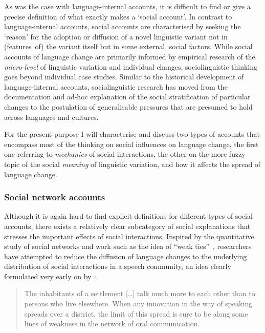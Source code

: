 As was the case with language-internal accounts, it is difficult to find or give a precise definition of what exactly makes a `social account'. In contrast to language-internal accounts, social accounts are characterised by seeking the `reason' for the adoption or diffusion of a novel linguistic variant not in (features~of) the variant itself but in some external, social factors.
While social accounts of language change are primarily informed by empirical research of the \emph{micro-level} of linguistic variation and individual changes, sociolinguistic thinking goes beyond individual case studies.
Similar to the historical development of language-internal accounts, sociolinguistic research %
has moved from the documentation and ad-hoc explanation of the social stratification of particular changes to the postulation of generalisable pressures that are presumed to hold across languages and cultures.

For the present purpose I will characterise and discuss two types of accounts that encompass most of the thinking on social influences on language change, the first one referring to \emph{mechanics} of social interactions, the other on the more fuzzy topic of the social \emph{meaning} of linguistic variation, and how it affects the spread of language change.

\subsubsection{Social network accounts}
\label{sec:interactorselection}

Although it is again hard to find explicit definitions for different types of social accounts, there exists a relatively clear subcategory of social explanations that stresses the important effects of social interactions. 
Inspired by the quantitative study of social networks and work such as the idea of ``weak ties''~\citep{Granovetter1973}, researchers have attempted to reduce the diffusion of language changes to the underlying distribution of social interactions in a speech community, an idea clearly formulated very early on by~\citet[p.476]{Bloomfield1933}:

\begin{quote}
The inhabitants of a settlement [\ldots] talk much more to each other than to persons who live elsewhere. When any innovation in the way of speaking spreads over a district, the limit of this spread is sure to be along some lines of weakness in the network of oral communication.
\end{quote}

